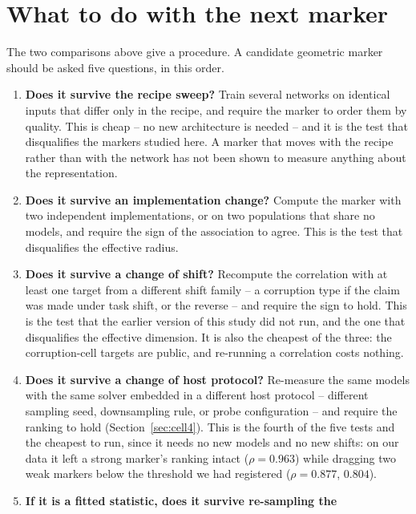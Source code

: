 \documentclass[10pt]{article}
\begin{document}
\section{What to do with the next marker}

\label{sec:practice}

The two comparisons above give a procedure. A candidate geometric marker should
be asked five questions, in this order.

\begin{enumerate}
\item \textbf{Does it survive the recipe sweep?} Train several networks on
      identical inputs that differ only in the recipe, and require the marker
      to order them by quality. This is cheap -- no new architecture is needed
      -- and it is the test that disqualifies the markers studied here. A
      marker that moves with the recipe rather than with the network has not
      been shown to measure anything about the representation.
\item \textbf{Does it survive an implementation change?} Compute the marker
      with two independent implementations, or on two populations that share
      no models, and require the sign of the association to agree. This is the
      test that disqualifies the effective radius.
\item \textbf{Does it survive a change of shift?} Recompute the correlation
      with at least one target from a different shift family -- a corruption
      type if the claim was made under task shift, or the reverse -- and
      require the sign to hold. This is the test that the earlier version of
      this study did not run, and the one that disqualifies the effective
      dimension. It is also the cheapest of the three: the corruption-cell
      targets are public, and re-running a correlation costs nothing.
\item \textbf{Does it survive a change of host protocol?} Re-measure the
      same models with the same solver embedded in a different host
      protocol -- different sampling seed, downsampling rule, or probe
      configuration -- and require the ranking to hold
      (Section~\ref{sec:cell4}). This is the fourth of the five tests and
      the cheapest to run, since it needs no new models and no new shifts:
      on our data it left a strong marker's ranking intact
      ($\rho = 0.963$) while dragging two weak markers below the threshold
      we had registered ($\rho = 0.877$, $0.804$).
\item \textbf{If it is a fitted statistic, does it survive re-sampling the
}
\end{enumerate}
\end{document}
